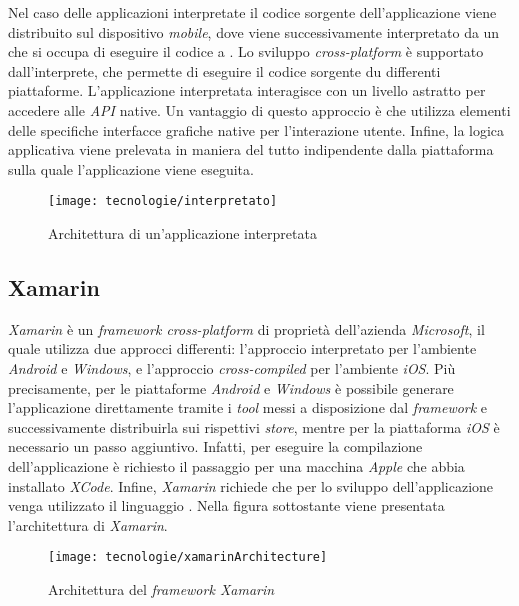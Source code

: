 \newpage

Nel caso delle applicazioni interpretate il codice sorgente dell'applicazione viene distribuito sul dispositivo \textit{mobile}, dove viene successivamente interpretato da un  che si occupa di eseguire il codice a . Lo sviluppo \textit{cross-platform}  è supportato dall'interprete, che permette di eseguire il codice sorgente du differenti piattaforme. L'applicazione interpretata interagisce con un livello astratto per accedere alle \textit{API} native. Un vantaggio di questo approccio è che utilizza elementi delle specifiche interfacce grafiche native per l'interazione utente. Infine, la logica applicativa viene prelevata in maniera del tutto indipendente dalla piattaforma sulla quale l'applicazione viene eseguita.

\begin{figure}[!h] 
    \centering 
    \texttt{[image: tecnologie/interpretato]} 
    \caption{Architettura di un'applicazione interpretata}
\end{figure}

\newpage

\subsection{Xamarin}

\textit{Xamarin} è un \textit{framework cross-platform} di proprietà dell'azienda \textit{Microsoft}, il quale utilizza due approcci differenti: l'approccio interpretato per l'ambiente \textit{Android} e \textit{Windows}, e l'approccio \textit{cross-compiled} per l'ambiente \textit{iOS}. Più precisamente, per le piattaforme \textit{Android} e \textit{Windows} è possibile generare l'applicazione direttamente tramite i \textit{tool} messi a disposizione dal \textit{framework} e successivamente distribuirla sui rispettivi \textit{store}, mentre per la piattaforma \textit{iOS} è necessario un passo aggiuntivo. Infatti, per eseguire la compilazione dell'applicazione è richiesto il passaggio per una macchina \textit{Apple} che abbia installato \textit{XCode}. Infine, \textit{Xamarin} richiede che per lo sviluppo dell'applicazione venga utilizzato il linguaggio . Nella figura sottostante viene presentata l'architettura di \textit{Xamarin}.

\begin{figure}[!h] 
    \centering 
    \texttt{[image: tecnologie/xamarinArchitecture]} 
    \caption{Architettura del \textit{framework Xamarin}}
\end{figure}

